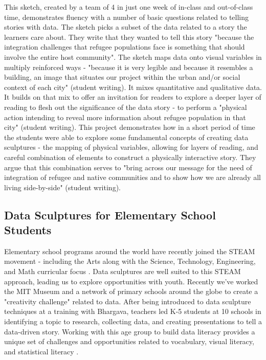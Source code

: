 \documentclass{sigchi-ext}
\begin{document}
This sketch, created by a team of 4 in just one week of in-class and out-of-class time, demonstrates fluency with a number of basic questions related to telling stories with data.  The sketch picks a subset of the data related to a story the learners care about. They write that they wanted to tell this story "because the integration challenges that refugee populations face is something that should involve the entire host community". The sketch maps data onto visual variables in multiply reinforced ways - "because it is very legible and because it resembles a building, an image that situates our project within the urban and/or social context of each city" (student writing).  It mixes quantitative and qualitative data. It builds on that mix to offer an invitation for readers to explore a deeper layer of reading to flesh out the significance of the data story - to perform a "physical action intending to reveal more information about refugee population in that city" (student writing).  This project demonstrates how in a short period of time the students were able to explore some fundamental concepts of creating data sculptures - the mapping of physical variables, allowing for layers of reading, and careful combination of elements to construct a physically interactive story.  They argue that this combination serves to "bring across our message for the need of integration of refugee and native communities and to show how we are already all living side-by-side" (student writing).

\subsection{Data Sculptures for Elementary School Students}

Elementary school programs around the world have recently joined the STEAM movement - including the Arts along with the Science, Technology, Engineering, and Math curricular focus \cite{Maeda_2012}. Data sculptures are well suited to this STEAM approach, leading us to explore opportunities with youth. Recently we've worked the MIT Museum and a network of primary schools around the globe to create a "creativity challenge" related to data.  After being introduced to data sculpture techniques at a training with Bhargava, teachers led K-5 students at 10 schools in identifying a topic to research, collecting data, and creating presentations to tell a data-driven story.  Working with this age group to build data literacy provides a unique set of challenges and opportunities related to vocabulary, visual literacy, and statistical literacy \cite{Hautea_Dasgupta_Hill_2017, Dasgupta_Hill_2017}.
\end{document}
